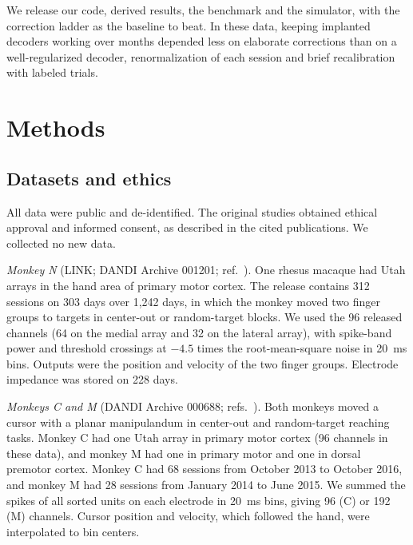 \documentclass[pdflatex,sn-nature]{sn-jnl}
\begin{document}
We release our code, derived results, the benchmark and the simulator, with the correction ladder as the baseline to
beat. In these data, keeping implanted decoders working over months depended less on elaborate corrections than on a
well-regularized decoder, renormalization of each session and brief recalibration with labeled trials.

\section*{Methods}

\subsection*{Datasets and ethics}

All data were public and de-identified. The original studies obtained ethical approval and informed consent, as
described in the cited publications. We collected no new data.

\textit{Monkey N} (LINK; DANDI Archive 001201\cite{data_link}; ref.~\cite{temmar2025}). One rhesus macaque had Utah arrays
in the hand area of primary motor cortex\cite{nason2021}. The release contains 312 sessions on 303 days over 1,242 days,
in which the monkey moved two finger groups to targets in center-out or random-target blocks. We used the 96 released
channels (64 on the medial array and 32 on the lateral array), with spike-band power and threshold crossings at $-4.5$
times the root-mean-square noise in 20~ms bins\cite{nason2020}. Outputs were the position and velocity of the two finger
groups. Electrode impedance was stored on 228 days.

\textit{Monkeys C and M} (DANDI Archive 000688\cite{data_perich}; refs.~\cite{gallego2020,perich2018}). Both monkeys moved a
cursor with a planar manipulandum in center-out and random-target reaching tasks. Monkey C had one Utah array in
primary motor cortex (96 channels in these data), and monkey M had one in primary motor and one in dorsal premotor
cortex. Monkey C had 68 sessions
from October 2013 to October 2016, and monkey M had 28 sessions from January 2014 to June 2015. We summed the spikes of
all sorted units on each electrode in 20~ms bins, giving 96 (C) or 192 (M) channels. Cursor position and velocity, which followed the hand, were
interpolated to bin centers.
\end{document}
